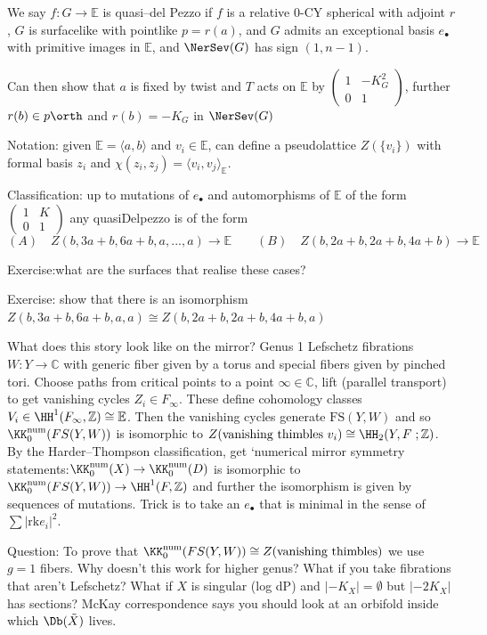 We say \(f:G\to \mathbb{E}\) is quasi--del Pezzo if \(f\) is a relative 0-CY
spherical with adjoint \(r\), \(G\) is surfacelike with
pointlike \(p=r(a)\), and \(G\) admits an exceptional basis \(e_\bullet\) with
primitive images in \(\mathbb{E}\), and \(\NerSev(G)\) has sign \((1,n-1)\).

Can then show that \(a\) is fixed by twist and \(T\) acts on \(\mathbb{E}\) by \((\begin{smallmatrix} 1&-K_G^2\\0&1 \end{smallmatrix})\), further \(r(b)\in p\orth\) and \(r(b)=-K_G\) in \(\NerSev(G)\)

Notation: given \(\mathbb{E}=\langle a,b \rangle\) and \(v_i\in \mathbb{E}\),
can define a pseudolattice \(Z(\{v_i\})\) with formal basis \(z_i\) and
\(\chi(z_i,z_j)=\langle v_i,v_j \rangle_\mathbb{E}\).

Classification: up to mutations of \(e_\bullet\) and automorphisms
of \(\mathbb{E}\) of the form \((\begin{smallmatrix}1&K\\0&1\end{smallmatrix})\)
any quasiDelpezzo is of the form
\[
    (A)\quad Z(b,3a+b, 6a+b, a,...,a)\to \mathbb{E}\qquad
    (B)\quad Z(b,2a+b,2a+b,4a+b)\to \mathbb{E}
\]

Exercise:what are the surfaces that realise these cases?

Exercise: show that there is an isomorphism \(Z(b,3a+b,6a+b,a,a)\cong
Z(b,2a+b,2a+b,4a+b,a)\)

What does this story look like on the mirror? Genus 1 Lefschetz fibrations
\(W:Y\to \mathbb{C}\) with generic fiber given by a torus and special fibers given
by pinched tori. Choose paths from critical points to a point \(\infty\in
\mathbb{C}\), lift (parallel transport) to get vanishing cycles \(Z_i\in
F_\infty\). These define cohomology classes \(V_i\in
\HH^1(F_\infty,\mathbb{Z})\cong \mathbb{E}\). Then the vanishing cycles generate
\(\text{FS}(Y,W)\) and so \(\KK_0^\text{num}(FS(Y,W))\) is isomorphic to
\(Z(\text{vanishing thimbles }v_i)\cong \HH_2(Y,F\;;\mathbb{Z})\). By the
Harder--Thompson classification, get `numerical mirror symmetry
statements:\(\KK_0^\text{num}(X)\to \KK_0^\text{num}(D)\) is isomorphic to
\(\KK_0^\text{num}(FS(Y,W))\to \HH^1(F,\mathbb{Z})\) and further the isomorphism
is given by sequences of mutations. Trick is to take an \(e_\bullet\) that is
minimal in the sense of \(\sum |\text{rk}e_i|^2\).

Question: To prove that \(\KK_0^\text{num}(FS(Y,W))\cong Z(\text{vanishing
thimbles})\) we use \(g=1\) fibers. Why doesn't this work for higher genus? What
if you take fibrations that aren't Lefschetz? What if \(X\) is singular (log dP)
and \(|-K_X|=\emptyset\) but \(|-2K_X|\) has sections? McKay correspondence says
you should look at an orbifold inside which \(\Db(\tilde X)\) lives.





